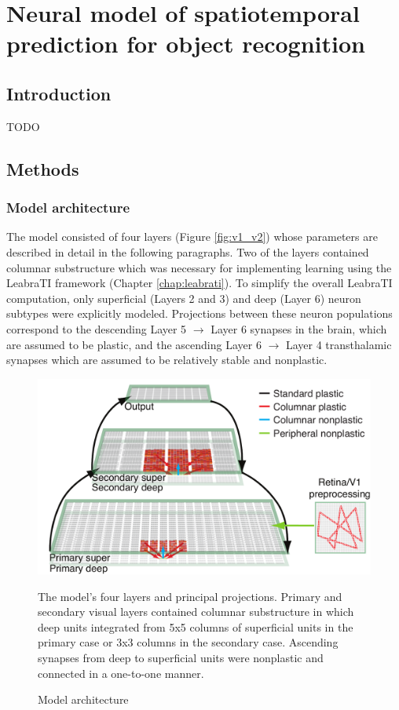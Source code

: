 \documentclass[dwyatte_dissertation.tex]{subfiles}
\begin{document}
\chapter{Neural model of spatiotemporal prediction for object recognition}

\section{Introduction}
TODO

\section{Methods}

\subsection{Model architecture}

The model consisted of four layers (Figure \ref{fig:v1_v2}) whose parameters are described in detail in the following paragraphs. Two of the layers contained columnar substructure which was necessary for implementing learning using the LeabraTI framework (Chapter \ref{chap:leabrati}). To simplify the overall LeabraTI computation, only superficial (Layers 2 and 3) and deep (Layer 6) neuron subtypes were explicitly modeled. Projections between these neuron populations correspond to the descending Layer 5 $\rightarrow$ Layer 6 synapses in the brain, which are assumed to be plastic, and the ascending Layer 6 $\rightarrow$ Layer 4 transthalamic synapses which are assumed to be relatively stable and nonplastic.

\begin{figure}[h!]
\begin{center}
\includegraphics[width=160mm]{figs/chap_sims/v1_v2_output_ti_annotated.pdf}
\end{center}
\caption{Model architecture}{The model's four layers and principal projections. Primary and secondary visual layers contained columnar substructure in which deep units integrated from 5x5 columns of superficial units in the primary case or 3x3 columns in the secondary case. Ascending synapses from deep to superficial units were nonplastic and connected in a one-to-one manner.}
\label{fig:v1_v2_output}
\end{figure}
\end{document}
